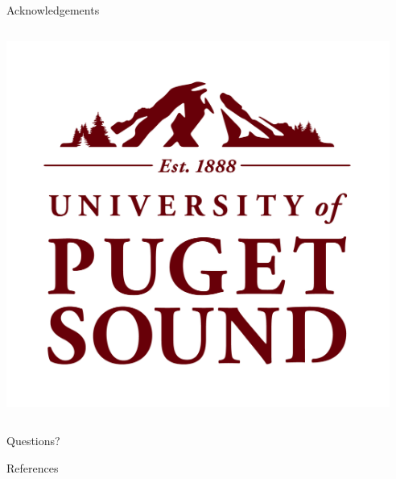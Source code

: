 \begin{frame}{Acknowledgements}
\begin{columns}[T,onlytextwidth]
\begin{minipage}[]{0.3\textwidth}
	\begin{centering}
    \includegraphics[width = \textwidth]{img/UofPS_stacked_maroonRGB_PNG}
    \end{centering}
\end{minipage}%
\begin{minipage}[]{0.15\textwidth}
~
\end{minipage}%
\end{columns}
\end{frame}

\begin{frame}[standout]
  Questions?
\end{frame}

\begin{frame}[allowframebreaks]{References}

  
  
\end{frame}

